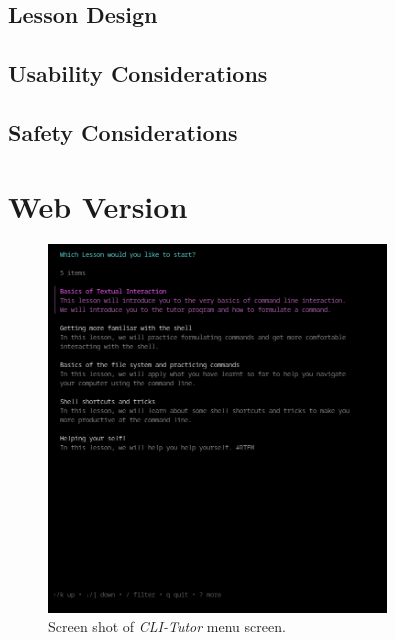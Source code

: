 \subsection{Lesson Design}
\subsection{Usability Considerations}
\subsection{Safety Considerations}
\section{Web Version}


\begin{figure}[htbp]
    \centering
    \includegraphics[width=0.8\textwidth]{img/climenu}
    \caption{Screen shot of \textit{CLI-Tutor} menu screen.}
    \label{fig:clitutormenu}
\end{figure}
